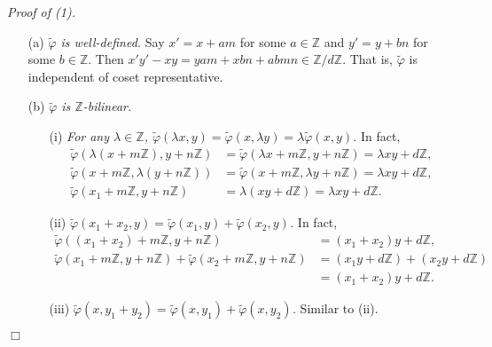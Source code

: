 \documentclass{article}
\begin{document}
\emph{Proof of (1).}
\begin{enumerate}
\item[(a)]
\emph{$\widetilde{\varphi}$ is well-defined.}
Say $x' = x + am$ for some $a \in \mathbb{Z}$
and $y' = y + bn$ for some $b \in \mathbb{Z}$.
Then $x'y' - xy = yam + xbn + abmn \in \mathbb{Z}/d\mathbb{Z}$.
That is, $\widetilde{\varphi}$
is independent of coset representative.
\item[(b)]
\emph{$\widetilde{\varphi}$ is $\mathbb{Z}$-bilinear.}
\begin{enumerate}
\item[(i)]
\emph{For any $\lambda \in \mathbb{Z}$,
$\widetilde{\varphi}(\lambda x, y)
= \widetilde{\varphi}(x, \lambda y)
= \lambda \widetilde{\varphi}(x, y)$.}
In fact,
\begin{align*}
  \widetilde{\varphi}(\lambda(x+m\mathbb{Z}), y+n\mathbb{Z})
  &= \widetilde{\varphi}(\lambda x+m\mathbb{Z}, y+n\mathbb{Z})
  = \lambda x y + d\mathbb{Z}, \\
  \widetilde{\varphi}(x+m\mathbb{Z}, \lambda(y+n\mathbb{Z}))
  &= \widetilde{\varphi}(x+m\mathbb{Z}, \lambda y+n\mathbb{Z})
  = \lambda x y + d\mathbb{Z}, \\
  \widetilde{\varphi}(x_1+m\mathbb{Z}, y+n\mathbb{Z})
  &= \lambda (x y + d\mathbb{Z})
  = \lambda x y + d\mathbb{Z}.
\end{align*}
\item[(ii)]
\emph{$\widetilde{\varphi}(x_1 + x_2, y)
= \widetilde{\varphi}(x_1, y) + \widetilde{\varphi}(x_2, y)$.}
In fact,
\begin{align*}
  \widetilde{\varphi}((x_1+x_2)+m\mathbb{Z}, y+n\mathbb{Z})
  &= (x_1 + x_2) y + d\mathbb{Z}, \\
  \widetilde{\varphi}(x_1+m\mathbb{Z}, y+n\mathbb{Z})
  + \widetilde{\varphi}(x_2+m\mathbb{Z}, y+n\mathbb{Z})
  &= (x_1 y + d\mathbb{Z}) + (x_2 y + d\mathbb{Z}) \\
  &= (x_1 + x_2) y + d\mathbb{Z}.
\end{align*}
\item[(iii)]
\emph{$\widetilde{\varphi}(x, y_1 + y_2)
= \widetilde{\varphi}(x, y_1) + \widetilde{\varphi}(x, y_2)$.}
Similar to (ii).
\end{enumerate}
\end{enumerate}
$\Box$ \\
\end{document}

